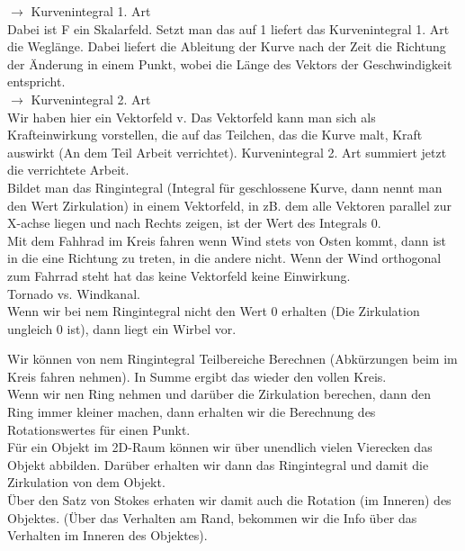 \documentclass{article}
\begin{document}
\noindent  $\rightarrow$ Kurvenintegral 1. Art\\ 
Dabei ist F ein Skalarfeld. Setzt man das auf 1 liefert das Kurvenintegral 1. Art die Weglänge. 
Dabei liefert die Ableitung der Kurve nach der Zeit die Richtung der Änderung in einem Punkt, wobei die Länge des Vektors der Geschwindigkeit entspricht.\\

\noindent  $\rightarrow$ Kurvenintegral 2. Art\\ 
Wir haben hier ein Vektorfeld v. Das Vektorfeld kann man sich als Krafteinwirkung vorstellen, die auf das Teilchen, das die Kurve malt, Kraft auswirkt (An dem Teil Arbeit verrichtet). Kurvenintegral 2. Art summiert jetzt die verrichtete Arbeit.\\

\noindent Bildet man das Ringintegral (Integral für geschlossene Kurve, dann nennt man den Wert Zirkulation) in einem Vektorfeld, in zB. dem alle Vektoren parallel zur X-achse liegen und nach Rechts zeigen, ist der Wert des Integrals 0.\\
Mit dem Fahhrad im Kreis fahren wenn Wind stets von Osten kommt, dann ist in die eine Richtung zu treten, in die andere nicht. Wenn der Wind orthogonal zum Fahrrad steht hat das keine Vektorfeld keine Einwirkung.\\

Tornado vs. Windkanal.\\

\noindent Wenn wir bei nem Ringintegral nicht den Wert 0 erhalten (Die Zirkulation ungleich 0 ist), dann liegt ein Wirbel vor.


\noindent  Wir können von nem Ringintegral Teilbereiche Berechnen (Abkürzungen beim im Kreis fahren nehmen). In Summe ergibt das wieder den vollen Kreis.\\
 
\noindent  Wenn wir nen Ring nehmen und darüber die Zirkulation berechen, dann den Ring immer kleiner machen, dann erhalten wir die Berechnung des Rotationswertes für einen Punkt.\\
 
\noindent  Für ein Objekt im 2D-Raum können wir über unendlich vielen Vierecken das Objekt abbilden. Darüber erhalten wir dann das Ringintegral und damit die Zirkulation von dem Objekt.\\
 Über den Satz von Stokes erhaten wir damit auch die Rotation (im Inneren) des Objektes. (Über das Verhalten am Rand, bekommen wir die Info über das Verhalten im Inneren des Objektes).\\
\end{document}
